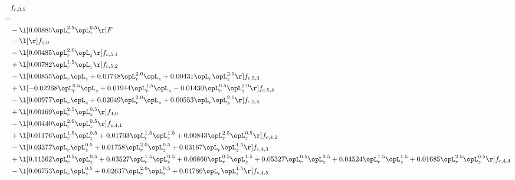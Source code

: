\begin{alignat}{2} 
\label{eq:f_35_2} 
& f_{c,3,5} \nonumber \\ 
 = \\ 
& - \l[  0.00885 \opL_r^{2.5} \opL_z^{0.5}  \r] F \nonumber \\ 
& - \l[  \r] f_{5,0} \nonumber \\ 
& - \l[  0.00485 \opL_r^{2.0} \opL_z  \r] f_{c,5,1} \nonumber \\ 
& + \l[  0.00782 \opL_r^{1.5} \opL_z  \r] f_{c,5,2} \nonumber \\ 
& - \l[  0.00855 \opL_r \opL_z +  0.01748 \opL_r^{2.0} \opL_z +  0.00431 \opL_r \opL_z^{2.0}  \r] f_{c,5,3} \nonumber \\ 
& + \l[  -0.02268 \opL_r^{0.5} \opL_z +  0.01944 \opL_r^{1.5} \opL_z   -0.01430 \opL_r^{0.5} \opL_z^{2.0}  \r] f_{c,5,4} \nonumber \\ 
& - \l[  0.00977 \opL_r \opL_z +  0.02049 \opL_r^{2.0} \opL_z +  0.00553 \opL_r \opL_z^{2.0}  \r] f_{c,5,5} \nonumber \\ 
& + \l[  0.00169 \opL_r^{2.5} \opL_z^{0.5}  \r] f_{4,0} \nonumber \\ 
& - \l[  0.00440 \opL_r^{2.0} \opL_z^{0.5}  \r] f_{c,4,1} \nonumber \\ 
& + \l[  0.01176 \opL_r^{1.5} \opL_z^{0.5} +  0.01703 \opL_r^{1.5} \opL_z^{1.5} +  0.00843 \opL_r^{2.5} \opL_z^{0.5}  \r] f_{c,4,2} \nonumber \\ 
& - \l[  0.03377 \opL_r \opL_z^{0.5} +  0.01758 \opL_r^{2.0} \opL_z^{0.5} +  0.03167 \opL_r \opL_z^{1.5}  \r] f_{c,4,3} \nonumber \\ 
& + \l[  0.11562 \opL_r^{0.5} \opL_z^{0.5} +  0.03527 \opL_r^{1.5} \opL_z^{0.5} +  0.06860 \opL_r^{0.5} \opL_z^{1.5} +  0.05327 \opL_r^{0.5} \opL_z^{2.5} +  0.04524 \opL_r^{1.5} \opL_z^{1.5} +  0.01685 \opL_r^{2.5} \opL_z^{0.5}  \r] f_{c,4,4} \nonumber \\ 
& - \l[  0.06753 \opL_r \opL_z^{0.5} +  0.02637 \opL_r^{2.0} \opL_z^{0.5} +  0.04786 \opL_r \opL_z^{1.5}  \r] f_{c,4,5} \nonumber \\ 
\end{alignat} 


